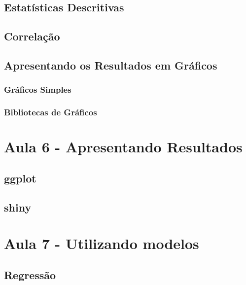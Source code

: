 \documentclass[12pt,a4paper,oneside]{erdc}
\begin{document}
	\section{Estatísticas Descritivas}
	
	\section{Correlação}
	
	\section{Apresentando os Resultados em Gráficos}
	
		\subsection{Gráficos Simples}
		
		\subsection{Bibliotecas de Gráficos}






%
%

\chapter{Aula 6 - Apresentando Resultados}

	\section{ggplot}

	\section{shiny}




%
%

\chapter{Aula 7 - Utilizando modelos}

	\section{Regressão}
	
\end{document}
